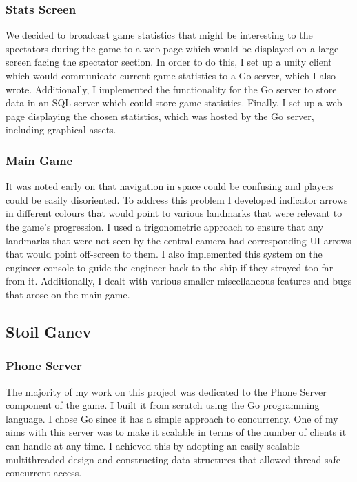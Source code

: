 \documentclass[a4paper,11pt]{article}
\begin{document}
\subsubsection{Stats Screen}

We decided to broadcast game statistics that might be interesting to the spectators during the game to a web page which would be displayed on a large screen facing the spectator section. In order to do this, I set up a unity client which would communicate current game statistics to a Go server, which I also wrote. Additionally, I implemented the functionality for the Go server to store data in an SQL server which could store game statistics. Finally, I set up a web page displaying the chosen statistics, which was hosted by the Go server, including graphical assets.

\subsubsection{Main Game}

It was noted early on that navigation in space could be confusing and players could be easily disoriented. To address this problem I developed indicator arrows in different colours that would point to various landmarks that were relevant to the game’s progression. I used a trigonometric approach to ensure that any landmarks that were not seen by the central camera had corresponding UI arrows that would point off-screen to them. I also implemented this system on the engineer console to guide the engineer back to the ship if they strayed too far from it. Additionally, I dealt with various smaller miscellaneous features and bugs that arose on the main game.

\clearpage

\subsection{Stoil Ganev}

\subsubsection{Phone Server}

The majority of my work on this project was dedicated to the Phone Server component of the game. I built it from scratch using the Go programming language. I chose Go since it has a simple approach to concurrency. One of my aims with this server was to make it scalable in terms of the number of clients it can handle at any time. I achieved this by adopting an easily scalable multithreaded design and constructing data structures that allowed thread-safe concurrent access.
\end{document}
